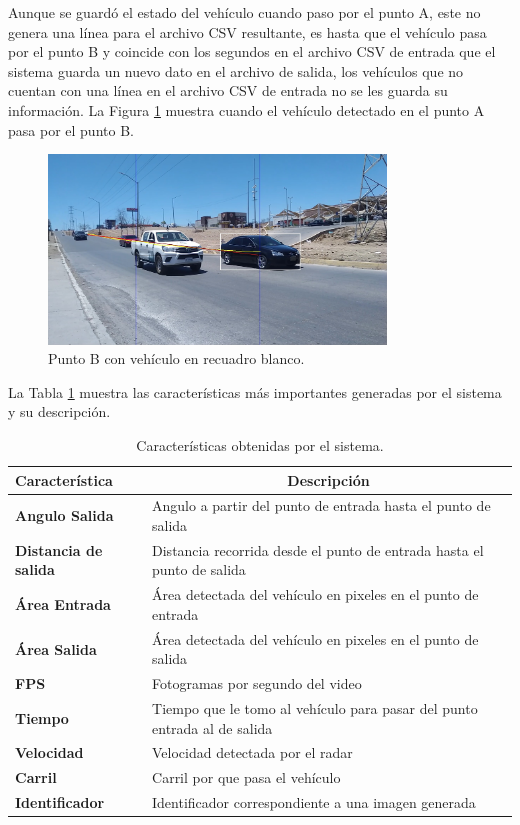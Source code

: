 Aunque se guardó el estado del vehículo cuando paso por el punto A, este no genera una línea para el archivo CSV resultante, es hasta que el vehículo pasa por el punto B y coincide con los segundos en el archivo CSV de entrada que el sistema guarda un nuevo dato en el archivo de salida, los vehículos que no cuentan con una línea en el archivo CSV de entrada no se les guarda su información. La Figura \ref{fig:PuntoB} muestra cuando el vehículo detectado en el punto A pasa por el punto B.

\begin{figure}[H]
    \centering
    \includegraphics[width=0.8\textwidth]{Metodologia/imgs/Punto_B.jpg}
    \caption{Punto B con vehículo en recuadro blanco.}
    \label{fig:PuntoB}
\end{figure}

La Tabla \ref{tab:CaracteristicasSistema} muestra las características más importantes generadas por el sistema y su descripción.

\begin{table}[H]
    \caption{Características obtenidas por el sistema.}
    \label{tab:CaracteristicasSistema}
    \begin{tabular}{|l|l|}
        \hline
        \textbf{Característica} & \multicolumn{1}{c|}{\textbf{Descripción}} \\ \hline
        \textbf{Angulo Salida} & Angulo a partir del punto de entrada hasta el punto de salida \\ \hline
        \textbf{Distancia de salida} & Distancia recorrida desde el punto de entrada hasta el punto de salida \\ \hline
        \textbf{Área Entrada} & Área detectada del vehículo en pixeles en el punto de entrada \\ \hline
        \textbf{Área Salida} & Área detectada del vehículo en pixeles en el punto de salida \\ \hline
        \textbf{FPS} & Fotogramas por segundo del video \\ \hline
        \textbf{Tiempo} & Tiempo que le tomo al vehículo para pasar del punto entrada al de salida \\ \hline
        \textbf{Velocidad} & Velocidad detectada por el radar \\ \hline
        \textbf{Carril} & Carril por que pasa el vehículo \\ \hline
        \textbf{Identificador} & Identificador correspondiente a una imagen generada \\ \hline
    \end{tabular}
\end{table}


